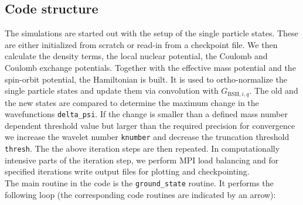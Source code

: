 \documentclass[3p]{elsarticle}
\begin{document}
\subsection{Code structure}
The simulations are started out with the setup of the single particle states. These are either initialized from scratch or read-in from a checkpoint file. We then calculate the density terms, the local nuclear potential, the Coulomb and Coulomb exchange potentials. Together with the effective mass potential and the spin-orbit potential, the Hamiltonian is built. It is used to ortho-normalize the single particle states and update them via convolution with $G_{\mathrm{BSH},{i,q}}$. The old and the new states are compared to determine the maximum change in the wavefunctions \texttt{delta\_psi}. If the change is smaller than a defined mass number dependent threshold value but larger than the required precision for convergence we increase the wavelet number \texttt{knumber} and decrease the truncation threshold \texttt{thresh}. The the above iteration steps are then repeated. In computationally intensive parts of the iteration step, we perform MPI load balancing and for specified iterations write output files for plotting and checkpointing.\\
The main routine in the code is the \texttt{ground\_state} routine. It performs the following loop (the corresponding code routines are indicated by an arrow):
\end{document}
